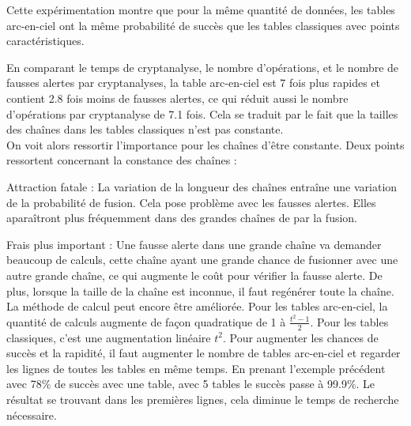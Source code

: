 	Cette expérimentation montre que pour la même quantité de données, les tables arc-en-ciel ont la même probabilité de succès que les tables classiques avec points caractéristiques.

	En comparant le temps de cryptanalyse, le nombre d'opérations, et le nombre de fausses alertes par cryptanalyses, la table arc-en-ciel est 7 fois plus rapides et contient 2.8 fois moins de fausses alertes, ce qui réduit aussi le nombre d'opérations par cryptanalyse de 7.1 fois. Cela se traduit par le fait que la tailles des chaînes dans les tables classiques n'est pas constante.\\

	On voit alors ressortir l'importance pour les chaînes d'être constante. Deux points ressortent concernant la constance des chaînes\cite{Oech03} :

	\bi
		\item Attraction fatale : La variation de la longueur des chaînes entraîne une variation de la probabilité de fusion. Cela pose problème avec les fausses alertes. Elles aparaîtront plus fréquemment dans des grandes chaînes de par la fusion.
		\item Frais plus important : Une fausse alerte dans une grande chaîne va demander beaucoup de calculs, cette chaîne ayant une grande chance de fusionner avec une autre grande chaîne, ce qui augmente le coût pour vérifier la fausse alerte. De plus, lorsque la taille de la chaîne est inconnue, il faut regénérer toute la chaîne.
	\ei\\

	La méthode de calcul peut encore être améliorée. Pour les tables arc-en-ciel, la quantité de calculs augmente de façon quadratique de 1 à $\frac{t^2-1}{2}$. Pour les tables classiques, c'est une augmentation linéaire $t^2$. Pour augmenter les chances de succès et la rapidité, il faut augmenter le nombre de tables arc-en-ciel et regarder les lignes de toutes les tables en même temps. En prenant l'exemple précédent avec 78\% de succès avec une table, avec 5 tables le succès passe à 99.9\%. Le résultat se trouvant dans les premières lignes, cela diminue le temps de recherche nécessaire.

\endinput{}
